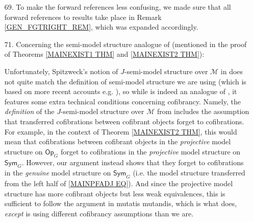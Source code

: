 \documentclass{article}
\begin{document}
\begin{itemize}
	\item[69.]
	To make the forward references less confusing, 
	we made sure that all forward references to results take place in
	Remark \ref{GEN_FGTRIGHT_REM},
	which was expanded accordingly.

	\item[71.] 
	Concerning the semi-model structure analogue of
	\cite[Thm. 11.3.2]{Hi03}
	(mentioned in the proof of Theorems \ref{MAINEXIST1 THM} and \ref{MAINEXIST2 THM}):
	
	Unfortunately, Spitzweck's notion
	of $J$-semi-model structure over $\mathcal M$ in \cite{Spi01}
	does not quite match the definition
	of semi-model structure
	we are using
	(which is based on more recent accounts e.g. \cite{Fre09,WY18}),
	so while \cite[Thm. 2]{Spi01}
	is indeed an analogue of \cite[Thm. 11.3.2]{Hi03},
	it features some extra technical conditions concerning cofibrancy.
	Namely, the \emph{definition} of the $J$-semi-model structure over $\mathcal M$ from \cite{Spi01}
	includes the assumption
	that transferred cofibrations between cofibrant objects forget to cofibrations.
	For example,
	in the context of Theorem \ref{MAINEXIST2 THM},
	this would mean that cofibrations between cofibrant objects in the \emph{projective} 
	model structure on $\mathsf{Op}_G$
	forget to cofibrations in the 
	\emph{projective} 
	model structure on $\mathsf{Sym}_G$.
	However, our argument instead shows that they forget to 
	cofibrations in the \emph{genuine} 
	model structure on $\mathsf{Sym}_G$
	(i.e. the model structure transferred from the left half of \eqref{MAINPFADJ EQ}).
	And since the projective model structure has more cofibrant objects but less weak equivalences, 
	this is sufficient to follow the argument in 
	\cite[Thm. 11.3.2]{Hi03} mutatis mutandis,
	which is what \cite[Thm. 2]{Spi01} does,
	\emph{except} \cite[Thm. 2]{Spi01}
	is using different cofibrancy assumptions than we are.

        

\end{itemize}
\end{document}
